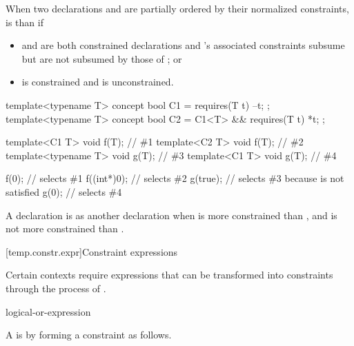 \pnum
When two declarations  and  are
partially ordered by their normalized constraints,  is 
 than  if
% 
\begin{itemize}
\item {} and  are both constrained
declarations and 's associated constraints subsume but 
are not subsumed by those of ; or

\item {} is constrained and  is
unconstrained. 
\end{itemize}
% 
\enterexample
\begin{codeblock}
template<typename T> concept bool C1 = requires(T t) { --t; };
template<typename T> concept bool C2 = C1<T> && requires(T t) { *t; };

template<C1 T> void f(T);       // \#1
template<C2 T> void f(T);       // \#2
template<typename T> void g(T); // \#3
template<C1 T> void g(T);       // \#4

f(0);       // selects \#1
f((int*)0); // selects \#2
g(true);    // selects \#3 because  is not satisfied
g(0);       // selects \#4
\end{codeblock}
\exitexample

\pnum
A declaration  is 
as another declaration  when  is more
constrained than , and  is not more
constrained than .


[temp.constr.expr]{Constraint expressions}

\pnum
Certain contexts require expressions that can be transformed
into constraints through the process of .

\begin{bnf}
\br
    logical-or-expression
\end{bnf}

\pnum
A  is  by forming a 
constraint as follows.

